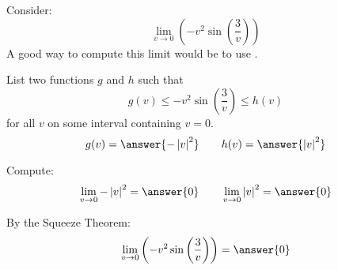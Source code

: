 \documentclass{ximera}
\author{Bart Snapp}
\begin{document}
\begin{exercise}


Consider:
\[
\lim_{v\to 0} \left(-v^2 \sin \left(\frac{3}{v}\right)\right)
\]
A good way to compute this limit would be to use .
\begin{exercise}
List two functions $g$ and $h$ such that
\[
g(v)\le -v^2 \sin \left(\frac{3}{v}\right) \le h(v)
\]
for all $v$ on some interval containing $v=0$.
\[
g(v)=\answer{-\left| v\right| ^2}\qquad h(v) =\answer{\left| v\right| ^2}
\]
\begin{exercise}
Compute:
\[
\lim_{v \to 0}-\left| v\right| ^2 = \answer{0}\qquad \lim_{v\to 0}\left| v\right| ^2 = \answer{0}
\]
\begin{exercise}
By the Squeeze Theorem:
\[
\lim_{v\to 0} \left(-v^2 \sin \left(\frac{3}{v}\right)\right) = \answer{0}
\]
\end{exercise}
\end{exercise}
\end{exercise}
\end{exercise}
\end{document}
